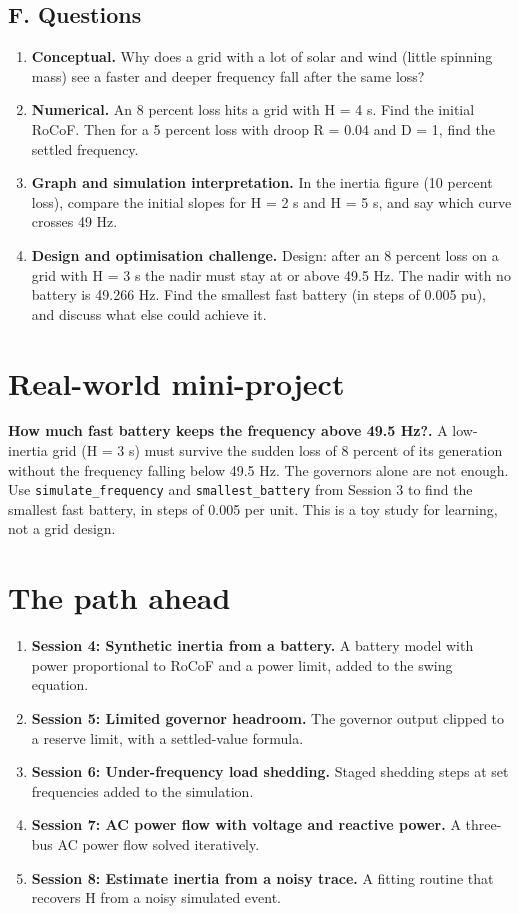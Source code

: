 \documentclass[11pt,a4paper]{article}
\begin{document}
\subsection*{F. Questions}
\begin{enumerate}[nosep]
\item \textbf{Conceptual.} Why does a grid with a lot of solar and wind (little spinning mass) see a faster and deeper frequency fall after the same loss?
\item \textbf{Numerical.} An 8 percent loss hits a grid with H = 4 s. Find the initial RoCoF. Then for a 5 percent loss with droop R = 0.04 and D = 1, find the settled frequency.
\item \textbf{Graph and simulation interpretation.} In the inertia figure (10 percent loss), compare the initial slopes for H = 2 s and H = 5 s, and say which curve crosses 49 Hz.
\item \textbf{Design and optimisation challenge.} Design: after an 8 percent loss on a grid with H = 3 s the nadir must stay at or above 49.5 Hz. The nadir with no battery is 49.266 Hz. Find the smallest fast battery (in steps of 0.005 pu), and discuss what else could achieve it.
\end{enumerate}

\section{Real-world mini-project}
\textbf{How much fast battery keeps the frequency above 49.5 Hz?.} A low-inertia grid (H = 3 s) must survive the sudden loss of 8 percent of its generation without the frequency falling below 49.5 Hz. The governors alone are not enough. Use \texttt{simulate\_frequency} and \texttt{smallest\_battery} from Session 3 to find the smallest fast battery, in steps of 0.005 per unit. This is a toy study for learning, not a grid design.

\section{The path ahead}
\begin{enumerate}[nosep]
\item \textbf{Session 4: Synthetic inertia from a battery.} A battery model with power proportional to RoCoF and a power limit, added to the swing equation.
\item \textbf{Session 5: Limited governor headroom.} The governor output clipped to a reserve limit, with a settled-value formula.
\item \textbf{Session 6: Under-frequency load shedding.} Staged shedding steps at set frequencies added to the simulation.
\item \textbf{Session 7: AC power flow with voltage and reactive power.} A three-bus AC power flow solved iteratively.
\item \textbf{Session 8: Estimate inertia from a noisy trace.} A fitting routine that recovers H from a noisy simulated event.
\end{enumerate}
\end{document}

